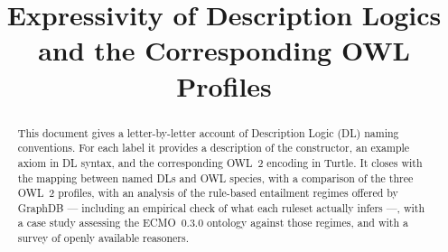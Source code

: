 \documentclass[11pt,a4paper]{article}
\title{Expressivity of Description Logics\\and the Corresponding OWL Profiles}
\author{}
\date{}
\begin{document}
\maketitle
\vspace{-2\baselineskip}

\begin{abstract}
\noindent This document gives a letter-by-letter account of Description Logic (DL)
naming conventions. For each label it provides a description of the constructor,
an example axiom in DL syntax, and the corresponding OWL~2 encoding in Turtle.
It closes with the mapping between named DLs and OWL species, with a
comparison of the three OWL~2 profiles, with an analysis of the rule-based
entailment regimes offered by GraphDB --- including an empirical check of what
each ruleset actually infers ---, with a case study assessing the ECMO~0.3.0
ontology against those regimes, and with a survey of openly available
reasoners.
\end{abstract}
\end{document}
